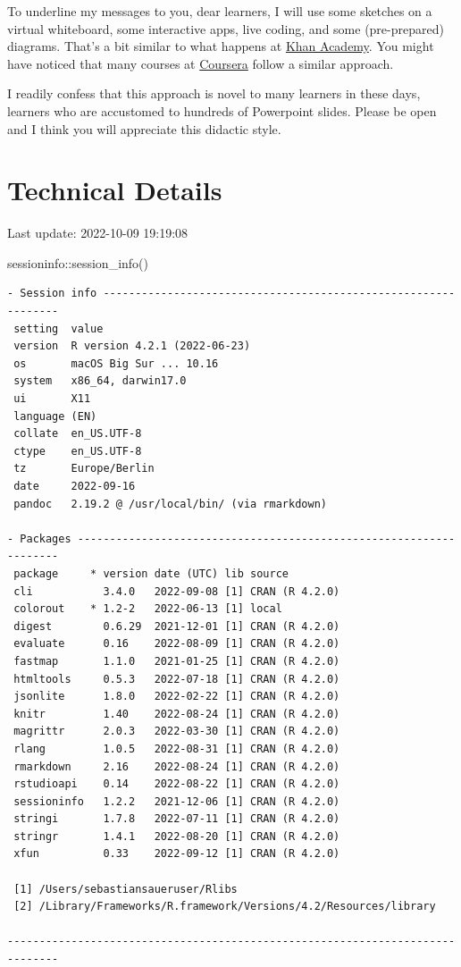 \documentclass[
  letterpaper,
  DIV=11,
  numbers=noendperiod]{scrreprt}
\newenvironment{Shaded}{\begin{snugshade}}{\end{snugshade}}
\newcommand{\FunctionTok}[1]{\textcolor[rgb]{0.28,0.35,0.67}{#1}}
\newcommand{\NormalTok}[1]{\textcolor[rgb]{0.00,0.23,0.31}{#1}}
\newcommand{\SpecialCharTok}[1]{\textcolor[rgb]{0.37,0.37,0.37}{#1}}
\theoremstyle{definition}
\theoremstyle{definition}
\theoremstyle{remark}
\begin{document}
To underline my messages to you, dear learners, I will use some sketches
on a virtual whiteboard, some interactive apps, live coding, and some
(pre-prepared) diagrams. That's a bit similar to what happens at
\href{https://de.khanacademy.org/}{Khan Academy}. You might have noticed
that many courses at \href{https://www.coursera.org/}{Coursera} follow a
similar approach.

I readily confess that this approach is novel to many learners in these
days, learners who are accustomed to hundreds of Powerpoint slides.
Please be open and I think you will appreciate this didactic style.

\hypertarget{technical-details}{%
\section*{Technical Details}\label{technical-details}}

Last update: 2022-10-09 19:19:08

\begin{Shaded}
\begin{Highlighting}[]
\NormalTok{sessioninfo}\SpecialCharTok{::}\FunctionTok{session\_info}\NormalTok{()}
\end{Highlighting}
\end{Shaded}

\begin{verbatim}
- Session info ---------------------------------------------------------------
 setting  value
 version  R version 4.2.1 (2022-06-23)
 os       macOS Big Sur ... 10.16
 system   x86_64, darwin17.0
 ui       X11
 language (EN)
 collate  en_US.UTF-8
 ctype    en_US.UTF-8
 tz       Europe/Berlin
 date     2022-09-16
 pandoc   2.19.2 @ /usr/local/bin/ (via rmarkdown)

- Packages -------------------------------------------------------------------
 package     * version date (UTC) lib source
 cli           3.4.0   2022-09-08 [1] CRAN (R 4.2.0)
 colorout    * 1.2-2   2022-06-13 [1] local
 digest        0.6.29  2021-12-01 [1] CRAN (R 4.2.0)
 evaluate      0.16    2022-08-09 [1] CRAN (R 4.2.0)
 fastmap       1.1.0   2021-01-25 [1] CRAN (R 4.2.0)
 htmltools     0.5.3   2022-07-18 [1] CRAN (R 4.2.0)
 jsonlite      1.8.0   2022-02-22 [1] CRAN (R 4.2.0)
 knitr         1.40    2022-08-24 [1] CRAN (R 4.2.0)
 magrittr      2.0.3   2022-03-30 [1] CRAN (R 4.2.0)
 rlang         1.0.5   2022-08-31 [1] CRAN (R 4.2.0)
 rmarkdown     2.16    2022-08-24 [1] CRAN (R 4.2.0)
 rstudioapi    0.14    2022-08-22 [1] CRAN (R 4.2.0)
 sessioninfo   1.2.2   2021-12-06 [1] CRAN (R 4.2.0)
 stringi       1.7.8   2022-07-11 [1] CRAN (R 4.2.0)
 stringr       1.4.1   2022-08-20 [1] CRAN (R 4.2.0)
 xfun          0.33    2022-09-12 [1] CRAN (R 4.2.0)

 [1] /Users/sebastiansaueruser/Rlibs
 [2] /Library/Frameworks/R.framework/Versions/4.2/Resources/library

------------------------------------------------------------------------------
\end{verbatim}
\end{document}
